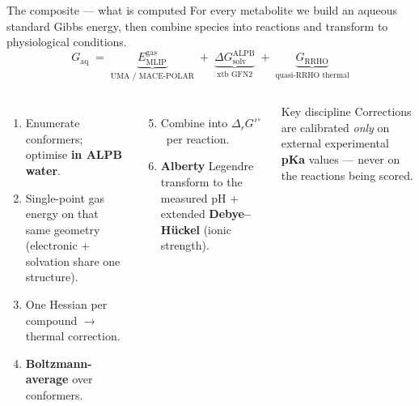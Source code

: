 \documentclass[aspectratio=169,11pt]{beamer}
\newcommand{\dg}{\ensuremath{\Delta_r G'^{\circ}}}
\begin{document}
\begin{frame}{The composite — what is computed}
  For every metabolite we build an aqueous standard Gibbs energy, then combine
  species into reactions and transform to physiological conditions.
  \[
    \boxed{\,G_{\text{aq}} \;=\;
      \underbrace{E_{\text{MLIP}}^{\text{gas}}}_{\text{UMA / MACE-POLAR}}
      \;+\;
      \underbrace{\Delta G_{\text{solv}}^{\text{ALPB}}}_{\text{xtb GFN2}}
      \;+\;
      \underbrace{G_{\text{RRHO}}}_{\text{quasi-RRHO thermal}}\,}
  \]
  \begin{columns}[T]
    \begin{enumerate}
      \item Enumerate conformers; optimise \textbf{in ALPB water}.
      \item Single-point gas energy on that same geometry
            (electronic + solvation share one structure).
      \item One Hessian per compound $\rightarrow$ thermal correction.
      \item \textbf{Boltzmann-average} over conformers.
    \end{enumerate}
    \begin{enumerate}\setcounter{enumi}{4}
      \item Combine into \dg\ per reaction.
      \item \textbf{Alberty} Legendre transform to the measured pH
            $+$ extended \textbf{Debye--H\"uckel} (ionic strength).
    \end{enumerate}
    \vspace{0.4em}
    \begin{alertblock}{Key discipline}
      Corrections are calibrated \emph{only} on external experimental
      \textbf{pKa} values — never on the reactions being scored.
    \end{alertblock}
  \end{columns}
\end{frame}
\end{document}
